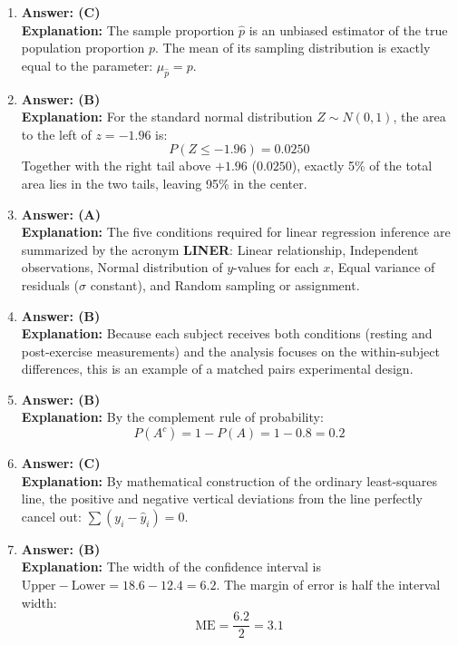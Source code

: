 \begin{enumerate}[leftmargin=1.5em]
  \item \textbf{Answer: (C)} \\
  \textbf{Explanation:} The sample proportion $\hat{p}$ is an unbiased estimator of the true population proportion $p$. The mean of its sampling distribution is exactly equal to the parameter: $\mu_{\hat{p}} = p$.

  \item \textbf{Answer: (B)} \\
  \textbf{Explanation:} For the standard normal distribution $Z \sim N(0, 1)$, the area to the left of $z = -1.96$ is:
  \[ P(Z \le -1.96) = 0.0250 \]
  Together with the right tail above $+1.96$ ($0.0250$), exactly 5\% of the total area lies in the two tails, leaving 95\% in the center.

  \item \textbf{Answer: (A)} \\
  \textbf{Explanation:} The five conditions required for linear regression inference are summarized by the acronym \textbf{LINER}: Linear relationship, Independent observations, Normal distribution of $y$-values for each $x$, Equal variance of residuals ($\sigma$ constant), and Random sampling or assignment.

  \item \textbf{Answer: (B)} \\
  \textbf{Explanation:} Because each subject receives both conditions (resting and post-exercise measurements) and the analysis focuses on the within-subject differences, this is an example of a matched pairs experimental design.

  \item \textbf{Answer: (B)} \\
  \textbf{Explanation:} By the complement rule of probability:
  \[ P(A^c) = 1 - P(A) = 1 - 0.8 = 0.2 \]

  \item \textbf{Answer: (C)} \\
  \textbf{Explanation:} By mathematical construction of the ordinary least-squares line, the positive and negative vertical deviations from the line perfectly cancel out: $\sum (y_i - \hat{y}_i) = 0$.

  \item \textbf{Answer: (B)} \\
  \textbf{Explanation:} The width of the confidence interval is $\text{Upper} - \text{Lower} = 18.6 - 12.4 = 6.2$. The margin of error is half the interval width:
  \[ \text{ME} = \frac{6.2}{2} = 3.1 \]


\end{enumerate}

